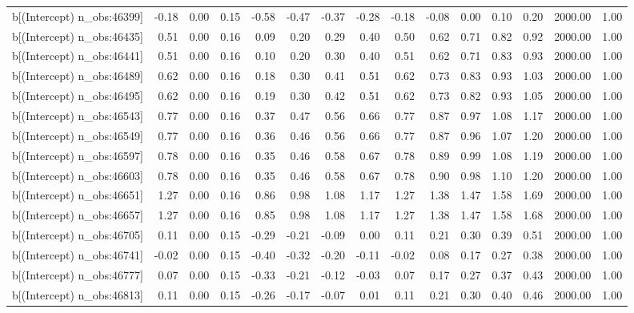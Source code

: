 \begin{table}[ht]
\begin{tabular}{rrrrrrrrrrrrrrr}
  b[(Intercept) n\_obs:46399] & -0.18 & 0.00 & 0.15 & -0.58 & -0.47 & -0.37 & -0.28 & -0.18 & -0.08 & 0.00 & 0.10 & 0.20 & 2000.00 & 1.00 \\ 
  b[(Intercept) n\_obs:46435] & 0.51 & 0.00 & 0.16 & 0.09 & 0.20 & 0.29 & 0.40 & 0.50 & 0.62 & 0.71 & 0.82 & 0.92 & 2000.00 & 1.00 \\ 
  b[(Intercept) n\_obs:46441] & 0.51 & 0.00 & 0.16 & 0.10 & 0.20 & 0.30 & 0.40 & 0.51 & 0.62 & 0.71 & 0.83 & 0.93 & 2000.00 & 1.00 \\ 
  b[(Intercept) n\_obs:46489] & 0.62 & 0.00 & 0.16 & 0.18 & 0.30 & 0.41 & 0.51 & 0.62 & 0.73 & 0.83 & 0.93 & 1.03 & 2000.00 & 1.00 \\ 
  b[(Intercept) n\_obs:46495] & 0.62 & 0.00 & 0.16 & 0.19 & 0.30 & 0.42 & 0.51 & 0.62 & 0.73 & 0.82 & 0.93 & 1.05 & 2000.00 & 1.00 \\ 
  b[(Intercept) n\_obs:46543] & 0.77 & 0.00 & 0.16 & 0.37 & 0.47 & 0.56 & 0.66 & 0.77 & 0.87 & 0.97 & 1.08 & 1.17 & 2000.00 & 1.00 \\ 
  b[(Intercept) n\_obs:46549] & 0.77 & 0.00 & 0.16 & 0.36 & 0.46 & 0.56 & 0.66 & 0.77 & 0.87 & 0.96 & 1.07 & 1.20 & 2000.00 & 1.00 \\ 
  b[(Intercept) n\_obs:46597] & 0.78 & 0.00 & 0.16 & 0.35 & 0.46 & 0.58 & 0.67 & 0.78 & 0.89 & 0.99 & 1.08 & 1.19 & 2000.00 & 1.00 \\ 
  b[(Intercept) n\_obs:46603] & 0.78 & 0.00 & 0.16 & 0.35 & 0.46 & 0.58 & 0.67 & 0.78 & 0.90 & 0.98 & 1.10 & 1.20 & 2000.00 & 1.00 \\ 
  b[(Intercept) n\_obs:46651] & 1.27 & 0.00 & 0.16 & 0.86 & 0.98 & 1.08 & 1.17 & 1.27 & 1.38 & 1.47 & 1.58 & 1.69 & 2000.00 & 1.00 \\ 
  b[(Intercept) n\_obs:46657] & 1.27 & 0.00 & 0.16 & 0.85 & 0.98 & 1.08 & 1.17 & 1.27 & 1.38 & 1.47 & 1.58 & 1.68 & 2000.00 & 1.00 \\ 
  b[(Intercept) n\_obs:46705] & 0.11 & 0.00 & 0.15 & -0.29 & -0.21 & -0.09 & 0.00 & 0.11 & 0.21 & 0.30 & 0.39 & 0.51 & 2000.00 & 1.00 \\ 
  b[(Intercept) n\_obs:46741] & -0.02 & 0.00 & 0.15 & -0.40 & -0.32 & -0.20 & -0.11 & -0.02 & 0.08 & 0.17 & 0.27 & 0.38 & 2000.00 & 1.00 \\ 
  b[(Intercept) n\_obs:46777] & 0.07 & 0.00 & 0.15 & -0.33 & -0.21 & -0.12 & -0.03 & 0.07 & 0.17 & 0.27 & 0.37 & 0.43 & 2000.00 & 1.00 \\ 
  b[(Intercept) n\_obs:46813] & 0.11 & 0.00 & 0.15 & -0.26 & -0.17 & -0.07 & 0.01 & 0.11 & 0.21 & 0.30 & 0.40 & 0.46 & 2000.00 & 1.00 \\ 

\end{tabular}
\end{table}

